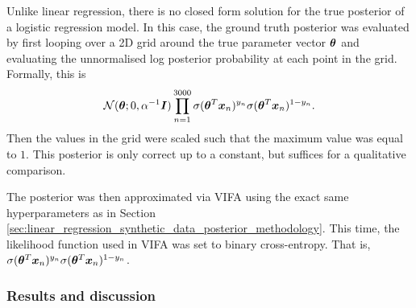 \documentclass[10pt]{article} %
\begin{document}
Unlike linear regression, there is no closed form solution for the true posterior of a logistic regression model. In this case, the ground truth posterior was evaluated by first looping over a 2D grid around the true parameter vector ${\bm{\theta}}$ and evaluating the unnormalised log posterior probability at each point in the grid. Formally, this is
\begin{equation}
	\mathcal{N} ( {\bm{\theta}} ; 0, \alpha^{-1} {\bm{I}}) \prod_{n=1}^{3000} \sigma({\bm{\theta}}^T {\bm{x}}_n)^{y_n} \sigma({\bm{\theta}}^T {\bm{x}}_n)^{1 - y_n}.
\end{equation}
Then the values in the grid were scaled such that the maximum value was equal to $1$. This posterior is only correct up to a constant, but suffices for a qualitative comparison.

The posterior was then approximated via VIFA using the exact same hyperparameters as in Section \ref{sec:linear_regression_synthetic_data_posterior_methodology}. This time, the likelihood function used in VIFA was set to binary cross-entropy. That is, $\sigma({\bm{\theta}}^T {\bm{x}}_n)^{y_n} \sigma({\bm{\theta}}^T {\bm{x}}_n)^{1 - y_n}$.


\subsubsection{Results and discussion}
\end{document}
